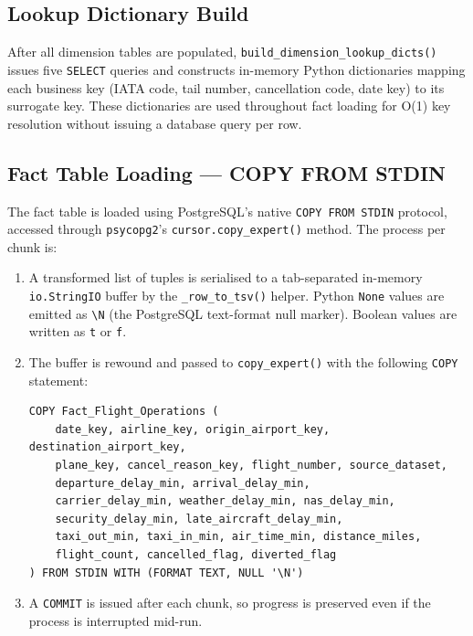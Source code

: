\documentclass[12pt,a4paper]{article}
\begin{document}
\subsection{Lookup Dictionary Build}

After all dimension tables are populated, \texttt{build\_dimension\_lookup\_dicts()} issues five \texttt{SELECT} queries and constructs
in-memory Python dictionaries mapping each business key (IATA code, tail
number, cancellation code, date key) to its surrogate key. These dictionaries
are used throughout fact loading for O(1) key resolution without issuing a
database query per row.

\subsection{Fact Table Loading — COPY FROM STDIN}

The fact table is loaded using PostgreSQL's native
\texttt{COPY FROM STDIN} protocol, accessed through
\texttt{psycopg2}'s \texttt{cursor.copy\_expert()} method. The process
per chunk is:

\begin{enumerate}
    \item A transformed list of tuples is serialised to a tab-separated
          in-memory \texttt{io.StringIO} buffer by the \texttt{\_row\_to\_tsv()}
          helper. Python \texttt{None} values are emitted as \texttt{{\textbackslash}N}
          (the PostgreSQL text-format null marker). Boolean values are written
          as \texttt{t} or \texttt{f}.
    \item The buffer is rewound and passed to \texttt{copy\_expert()} with the
          following \texttt{COPY} statement:
\begin{lstlisting}[style=sql]
COPY Fact_Flight_Operations (
    date_key, airline_key, origin_airport_key, destination_airport_key,
    plane_key, cancel_reason_key, flight_number, source_dataset,
    departure_delay_min, arrival_delay_min,
    carrier_delay_min, weather_delay_min, nas_delay_min,
    security_delay_min, late_aircraft_delay_min,
    taxi_out_min, taxi_in_min, air_time_min, distance_miles,
    flight_count, cancelled_flag, diverted_flag
) FROM STDIN WITH (FORMAT TEXT, NULL '\N')
\end{lstlisting}
    \item A \texttt{COMMIT} is issued after each chunk, so progress is
          preserved even if the process is interrupted mid-run.
\end{enumerate}
\end{document}
